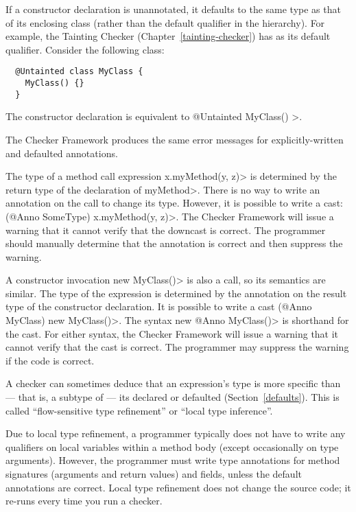 
If a constructor declaration is unannotated, it defaults to the same type as that of
its enclosing class (rather than the default qualifier in the hierarchy).
For example, the Tainting Checker (Chapter~\ref{tainting-checker}) has 
as its default qualifier. Consider the following class:

\begin{Verbatim}
  @Untainted class MyClass {
    MyClass() {}
  }
\end{Verbatim}

\noindent
The constructor declaration is equivalent to \<@Untainted MyClass() \ttlcb\ttrcb>.

The Checker Framework produces the same error messages for
explicitly-written and defaulted annotations.



The type of a method call expression \<x.myMethod(y, z)> is determined by
the return type of the declaration of \<myMethod>.  There is no way to
write an annotation on the call to change its type.  However, it is
possible to write a cast:  \<(@Anno SomeType) x.myMethod(y, z)>.  The Checker
Framework will issue a warning that it cannot verify that the downcast is
correct.  The programmer should manually determine that the annotation is
correct and then suppress the warning.

A constructor invocation \<new MyClass()> is also a call, so its semantics
are similar.  The type of the expression is determined by the annotation on
the result type of the constructor declaration.  It is possible to write a cast
\<(@Anno MyClass) new MyClass()>.  The syntax \<new @Anno MyClass()> is shorthand
for the cast.  For either syntax, the Checker Framework will issue a
warning that it cannot verify that the cast is correct.  The programmer may
suppress the warning if the code is correct.



A checker can sometimes deduce that an expression's type is more specific
than --- that is, a subtype of --- its declared or defaulted (Section~\ref{defaults}).
This is called ``flow-sensitive type refinement'' or ``local type inference''.

Due to local type refinement, a programmer typically
does not have to write any qualifiers on local variables within a method body
(except occasionally on type arguments).
However, the programmer must write type annotations for method
signatures (arguments and return values) and fields, unless the default
annotations are correct.
Local type refinement does not change the source code; it re-runs every time
you run a checker.


